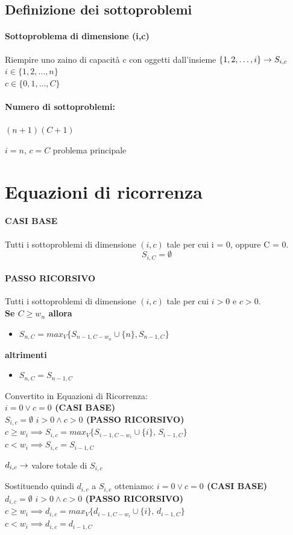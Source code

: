 \subsection{Definizione dei sottoproblemi}
\paragraph*{Sottoproblema di dimensione (i,c)}
Riempire uno zaino di capacità c con oggetti dall'insieme $\{1,2,\dots,i\} \rightarrow S_{i,c}$\\
$i \in \{1,2,\dots,n\}$\\
$c \in \{0,1,\dots,C\}$
\paragraph*{Numero di sottoproblemi:}$(n+1)(C+1)$
\begin{mdframed}[backgroundcolor=yellow]
    $i=n,\, c=C$ \ra problema principale
\end{mdframed}
\section{Equazioni di ricorrenza}
\paragraph*{CASI BASE} \ra Tutti i sottoproblemi di dimensione $(i,c)$ tale per cui i = 0, oppure
C = 0.
\[S_{i,C} = \emptyset\]
\paragraph*{PASSO RICORSIVO} \ra Tutti i sottoproblemi di dimensione $(i,c)$ tale per cui
$i>0$ e $c>0$.\\
\textbf{Se $C \geq w_n$ allora}
\begin{itemize}
    \item $S_{n,C} = max_V\{S_{n-1, C-w_n} \cup \{n\},S_{n-1, C}\}$
\end{itemize}
\textbf{altrimenti}
\begin{itemize}
    \item $S_{n,C} = S_{n-1,C}$
\end{itemize}
Convertito in Equazioni di Ricorrenza:\\
\textbf{$i=0 \vee c=0$ (CASI BASE)}\\
$S_{i,c} = \emptyset$
\textbf{$i>0 \wedge c>0$ (PASSO RICORSIVO)}\\
$c \geq w_i \implies S_{i,c} = max_V\{S_{i-1,C-w_i} \cup \{i\},\,S_{i-1,C}\}$\\
$c < w_i \implies S_{i,c} = S_{i-1,C}$\\
\begin{mdframed}[backgroundcolor=yellow]
    $d_{i,c} \rightarrow$ valore totale di $S_{i,c}$
\end{mdframed}
Sostituendo quindi $d_{i,c}$ a $S_{i,c}$ otteniamo:
\textbf{$i=0 \vee c=0$ (CASI BASE)}\\
$d_{i,c} = \emptyset$
\textbf{$i>0 \wedge c>0$ (PASSO RICORSIVO)}\\
$c \geq w_i \implies d_{i,c} = max_V\{d_{i-1,C-w_i} \cup \{i\},\,d_{i-1,C}\}$\\
$c < w_i \implies d_{i,c} = d_{i-1,C}$\\
